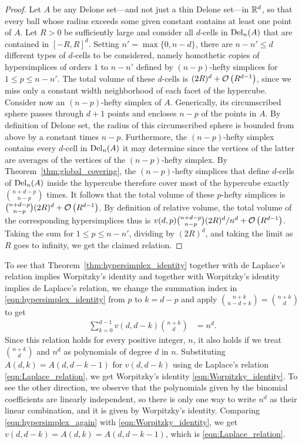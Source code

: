 \documentclass[10pt,a4paper]{article}
\newcommand {\mm}[1] {\ifmmode{#1}\else{\mbox{\(#1\)}}\fi}
\theoremstyle{plain}
\newcommand{\Rspace}        {\mm{{\mathbb R}}}
\newcommand{\Delaunay}[2]   {\mm{{\rm Del}_{#1}{({#2})}}}
\newcommand{\bigOh}[1]      {\mm{\mathcal{O}\left({#1}\right)}}
\begin{document}
\begin{proof}
  Let $A$ be any Delone set---and not just a thin Delone set---in $\Rspace^d$, so that every ball whose radius exceeds some given constant contains at least one point of $A$.
  Let $R > 0$ be sufficiently large and consider all $d$-cells in $\Delaunay{n}{A}$ that are contained in $[-R,R]^d$.
  Setting $n' = \max \{ 0, n-d \}$, there are $n-n' \leq d$ different types of $d$-cells to be considered, namely homothetic copies of hypersimplices of orders $1$ to $n-n'$ defined by $(n-p)$-hefty simplices for $1 \leq p \leq n-n'$.
  The total volume of these $d$-cells is $(2R)^d + \bigOh{R^{d-1}}$, since we miss only a constant width neighborhood of each facet of the hypercube.
  \smallskip
  Consider now an $(n-p)$-hefty simplex of $A$.
  Generically, its circumscribed sphere passes through $d+1$ points and encloses $n-p$ of the points in $A$.
  By definition of Delone set, the radius of this circumscribed sphere is bounded from above by a constant times $n-p$.
  Furthermore, the $(n-p)$-hefty simplex contains every $d$-cell in $\Delaunay{n}{A}$ it may determine since the vertices of the latter are averages of the vertices of the $(n-p)$-hefty simplex.
  By Theorem~\ref{thm:global_covering}, the $(n-p)$-hefty simplices that define $d$-cells of $\Delaunay{n}{A}$ inside the hypercube therefore cover most of the hypercube exactly $\binom{n+d-p}{n-p}$ times.
  It follows that the total volume of these $p$-hefty simplices is $\binom{n+d-p}{n-p} (2R)^d + \bigOh{R^{d-1}}$.
  By definition of relative volume, the total volume of the corresponding hypersimplices thus is ${v(d,p)} \binom{n+d-p}{n-p} (2R)^d / n^d + \bigOh{R^{d-1}}$.
  Taking the sum for $1 \leq p \leq n-n'$, dividing by $(2R)^d$, and taking the limit as $R$ goes to infinity, we get the claimed relation.
\end{proof}
To see that Theorem~\ref{thm:hypersimplex_identity} together with de Laplace's relation implies Worpitzky's identity and together with Worpitzky's identity implies de Laplace's relation, we change the summation index in \eqref{eqn:hypersimplex_identity} from $p$ to $k=d-p$ and apply $\binom{n+k}{n-d+k} = \binom{n+k}{d}$ to get
\begin{align}
  \sum\nolimits_{k=0}^{d-1} v(d,d-k) \binom{n+k}{d} &= n^d .
  \label{eqn:hypersimplex_again}
\end{align}
Since this relation holds for every positive integer, $n$, it also holds if we treat $\binom{n+k}{d}$ and $n^d$ as polynomials of degree $d$ in $n$.
Substituting $A(d,k) = A(d,d-k-1)$ for $v(d,d-k)$ using de Laplace's relation \eqref{eqn:Laplace_relation}, we get Worpitzky's identity \eqref{eqn:Worpitzky_identity}.
To see the other direction, we observe that the polynomials given by the binomial coefficients are linearly independent, so there is only one way to write $n^d$ as their linear combination, and it is given by Worpitzky's identity.
Comparing \eqref{eqn:hypersimplex_again} with \eqref{eqn:Worpitzky_identity}, we get $v(d,d-k) = A(d,k) = A(d,d-k-1)$, which is \eqref{eqn:Laplace_relation}.
\end{document}
